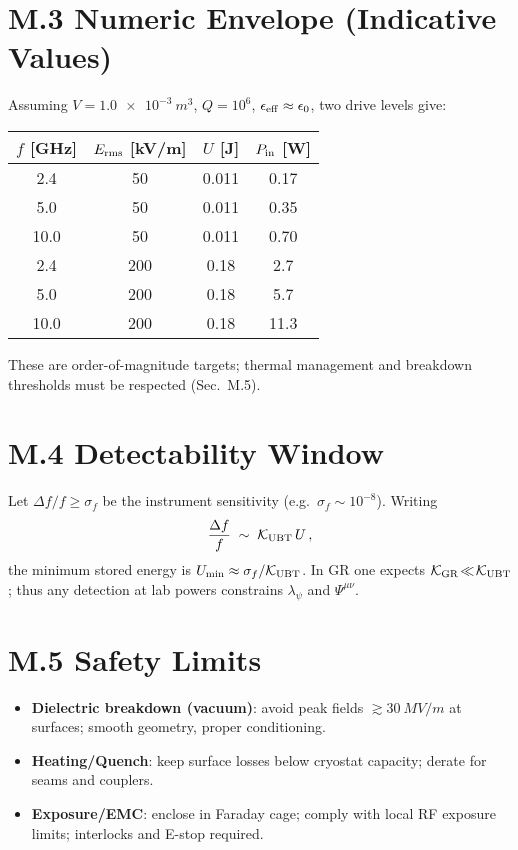 \documentclass[12pt]{article}
\begin{document}
\section*{M.3 Numeric Envelope (Indicative Values)}
Assuming $V=\SI{1.0e-3}{m^3}$, $Q=10^6$, $\epsilon_{\rm eff}\approx \epsilon_0$, two drive levels give:
\begin{center}\small
\begin{tabular}{|c|c|c|c|}
\hline
$f$ [GHz] & $E_{\rm rms}$ [kV/m] & $U$ [J] & $P_{\rm in}$ [W] \\ \hline
2.4 & 50  & 0.011 & 0.17 \\
5.0 & 50  & 0.011 & 0.35 \\
10.0& 50  & 0.011 & 0.70 \\ \hline
2.4 & 200 & 0.18  & 2.7  \\
5.0 & 200 & 0.18  & 5.7  \\
10.0& 200 & 0.18  & 11.3 \\ \hline
\end{tabular}
\end{center}
These are order-of-magnitude targets; thermal management and breakdown thresholds must be respected (Sec.\ M.5).

\section*{M.4 Detectability Window}
Let $\Delta f/f \ge \sigma_f$ be the instrument sensitivity (e.g.\ $\sigma_f\sim 10^{-8}$). Writing
\begin{equation}
\frac{\Delta f}{f} \;\sim\; \mathcal{K}_{\rm UBT}\, U \,,
\end{equation}
the minimum stored energy is $U_{\min}\approx \sigma_f/\mathcal{K}_{\rm UBT}$. In GR one expects $\mathcal{K}_{\rm GR}\!\ll\!\mathcal{K}_{\rm UBT}$; thus any detection at lab powers constrains $\lambda_\psi$ and $\Psi^{\mu\nu}$.

\section*{M.5 Safety Limits}
\begin{itemize}
\item \textbf{Dielectric breakdown (vacuum)}: avoid peak fields $\gtrsim \SI{30}{MV/m}$ at surfaces; smooth geometry, proper conditioning.
\item \textbf{Heating/Quench}: keep surface losses below cryostat capacity; derate for seams and couplers.
\item \textbf{Exposure/EMC}: enclose in Faraday cage; comply with local RF exposure limits; interlocks and E-stop required.
\end{itemize}
\end{document}
